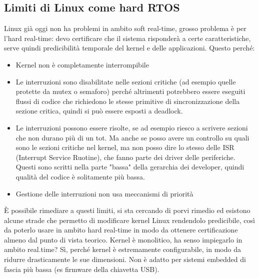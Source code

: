 \documentclass[12pt, oneside]{extbook}
\begin{document}
\subsection{Limiti di Linux come hard RTOS}
Linux già oggi non ha problemi in ambito soft real-time, grosso problema è per l'hard real-time: devo certificare che il sistema risponderà a certe caratteristiche, serve quindi predicibilità temporale del kernel e delle applicazioni. Questo perché:
\begin{itemize}
\item Kernel non è completamente interrompibile
\item Le interruzioni sono disabilitate nelle sezioni critiche (ad esempio quelle protette da mutex o semaforo) perché altrimenti potrebbero essere eseguiti flussi di codice che richiedono le stesse primitive di sincronizzazione della sezione critica, quindi si può essere esposti a deadlock.
\item Le interruzioni possono essere risolte, se ad esempio riesco a scrivere sezioni che non durano più di un tot. Ma anche se posso avere un controllo su quali sono le sezioni critiche nel kernel, ma non posso dire lo stesso delle ISR (Interrupt Service Ruotine), che fanno parte dei driver delle periferiche. Questi sono scritti nella parte "bassa" della gerarchia dei developer, quindi qualità del codice è solitamente più bassa.
\item Gestione delle interruzioni non usa meccanismi di priorità 
\end{itemize}
È possibile rimediare a questi limiti, si sta cercando di porvi rimedio ed esistono alcune strade che permetto di modificare kernel Linux rendendolo predicibile, così da poterlo usare in ambito hard real-time in modo da ottenere certificazione almeno dal punto di vista teorico.
Kernel è monolitico, ha senso impiegarlo in ambito real.time? Sì, perché kernel è estremamente configurabile, in modo da ridurre drasticamente le sue dimensioni. Non è adatto per sistemi embedded di fascia più bassa (es firmware della chiavetta USB).
\end{document}
